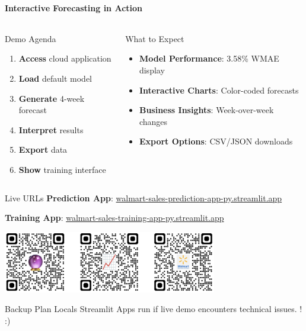 { 
	\framesubtitle{Interactive Forecasting in Action}
	
	\begin{columns}
		\begin{column}{0.48\textwidth}
			\begin{block}{Demo Agenda}
				\begin{enumerate}
					\item \textbf{Access} cloud application
					\item \textbf{Load} default model
					\item \textbf{Generate} 4-week forecast
					\item \textbf{Interpret} results
					\item \textbf{Export} data
					\item \textbf{Show} training interface
				\end{enumerate}
			\end{block}
		\end{column}
		
		\begin{column}{0.48\textwidth}
			\begin{block}{What to Expect}
				\begin{itemize}
					\item \textbf{Model Performance}: 3.58\% WMAE display
					\item \textbf{Interactive Charts}: Color-coded forecasts
					\item \textbf{Business Insights}: Week-over-week changes
					\item \textbf{Export Options}: CSV/JSON downloads
				\end{itemize}
			\end{block}
		\end{column}
	\end{columns}
\begin{alertblock}{Live URLs}
	\textbf{Prediction App}: \url{walmart-sales-prediction-app-py.streamlit.app}
	
	\textbf{Training App}: \url{walmart-sales-training-app-py.streamlit.app}
	
	\vspace{0.2cm}
	\centering
	\includegraphics[width=0.7\textwidth]{images/resultsDemo/StaticQR.png}

\end{alertblock}

\begin{exampleblock}{Backup Plan}
	Locals Streamlit Apps run if live demo encounters technical issues. ! :) 
\end{exampleblock}

}

